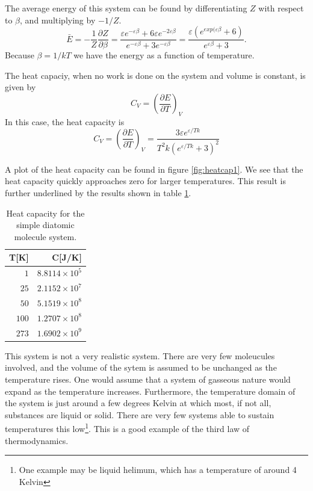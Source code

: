 \documentclass[10pt,a4paper]{amsart}
\begin{document}
The average energy of this system can be found by differentiating $Z$ with respect to $\beta$, and multiplying by $-1/Z$.
\begin{equation}
\bar{E} = -\frac{1}{Z}\frac{\partial Z}{\partial \beta}=
\frac{\varepsilon e^{-\varepsilon\beta}+6\varepsilon e^{-2\varepsilon\beta} }{e^{-\varepsilon\beta} + 3e^{-\varepsilon\beta}} = \frac{\varepsilon(e^{exp(\varepsilon\beta}+6)}{e^{\varepsilon\beta}+3}.
\end{equation}
Because $\beta = 1/kT$ we have the energy as a function of temperature.

The heat capaciy, when no work is done on the system and volume is constant, is given by
\begin{equation}
C_V = \left(\frac{\partial E}{\partial T} \right)_V
\end{equation}
In this case, the heat capacity is 
\begin{equation*}
C_V =\left(\frac{\partial E}{\partial T} \right)_V =
\frac{3\varepsilon e^{\varepsilon/Tk}}{T^2k(e^{\varepsilon/Tk}+3)^2}
\end{equation*}

A plot of the heat capacity can be found in figure \ref{fig:heatcap1}. We see that the heat capacity quickly approaches zero for larger temperatures. This result is further underlined by the results shown in table \ref{tab:heatcap1}.

\begin{table}
	\caption{Heat capacity for the simple diatomic molecule system.}
	\begin{tabular}{rr} \hline
	T[K]  & C[J/K] \\ \hline 
	$  1$ & $8.8114\times10^5$ \\
	$ 25$ & $2.1152\times10^7$ \\
	$ 50$ & $5.1519\times10^8$ \\
	$100$ & $1.2707\times10^8$ \\
	$273$ & $1.6902\times10^9$ \\ \hline
	\end{tabular}
	\label{tab:heatcap1}
\end{table}

This system is not a very realistic system. There are very few moleucules involved, and the volume of the sytem is assumed to be unchanged as the temperature rises. One would assume that a system of gasseous nature would expand as the temperature increases. Furthermore, the temperature domain of the system is just around a few degrees Kelvin at which most, if not all, substances are liquid or solid. There are very few systems able to sustain temperatures this low\footnote{One example may be liquid helimum, which has a temperature of around 4 Kelvin}. This is a good example of the third law of thermodynamics.
\end{document}
